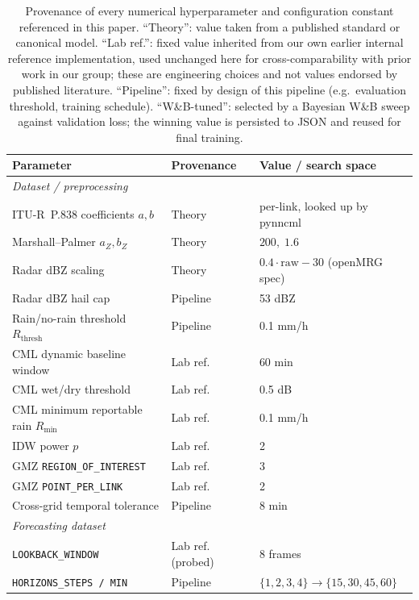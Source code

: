 \documentclass[12pt, a4paper]{article}
\begin{document}
\begin{table}[h]
\centering
\caption{Provenance of every numerical hyperparameter and configuration
constant referenced in this paper. ``Theory'': value taken from a
published standard or canonical model. ``Lab ref.'': fixed value
inherited from our own earlier internal reference implementation, used
unchanged here for cross-comparability with prior work in our group;
these are engineering choices and not values endorsed by published
literature. ``Pipeline'': fixed by design of this pipeline (e.g.\
evaluation threshold, training schedule). ``W\&B-tuned'': selected by
a Bayesian W\&B sweep against validation loss; the winning value is
persisted to JSON and reused for final training.}
\label{tab:hparam_provenance}
\begin{tabular}{p{5.5cm}lp{6cm}}
\toprule
Parameter & Provenance & Value / search space \\
\midrule
\multicolumn{3}{l}{\textit{Dataset / preprocessing}} \\
ITU-R~P.838 coefficients $a, b$         & Theory      & per-link, looked up by pynncml \\
Marshall--Palmer $a_Z, b_Z$              & Theory      & $200,\;1.6$ \\
Radar dBZ scaling                        & Theory      & $0.4\!\cdot\!\text{raw}-30$ (openMRG spec) \\
Radar dBZ hail cap                       & Pipeline    & 53 dBZ \\
Rain/no-rain threshold $R_{\text{thresh}}$ & Pipeline  & 0.1 mm/h \\
CML dynamic baseline window              & Lab ref.    & 60 min \\
CML wet/dry threshold                    & Lab ref.    & 0.5 dB \\
CML minimum reportable rain $R_{\min}$   & Lab ref.    & 0.1 mm/h \\
IDW power $p$                            & Lab ref.    & 2 \\
GMZ \texttt{REGION\_OF\_INTEREST}        & Lab ref.    & 3 \\
GMZ \texttt{POINT\_PER\_LINK}            & Lab ref.    & 2 \\
Cross-grid temporal tolerance            & Pipeline    & 8 min \\
\midrule
\multicolumn{3}{l}{\textit{Forecasting dataset}} \\
\texttt{LOOKBACK\_WINDOW}                & Lab ref. (probed) & 8 frames \\
\texttt{HORIZONS\_STEPS / MIN}           & Pipeline    & $\{1,2,3,4\}\rightarrow\{15,30,45,60\}$ \\

\end{tabular}
\end{table}
\end{document}
